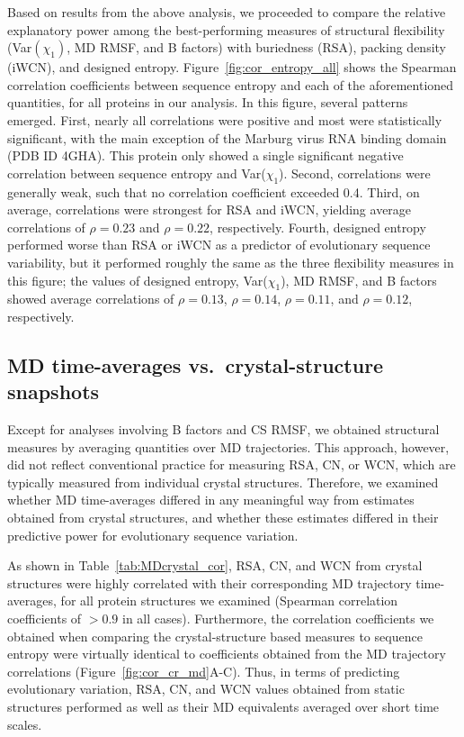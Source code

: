 \documentclass[smallextended]{svjour3}
\begin{document}
Based on results from the above analysis, we proceeded to compare the relative explanatory power among the best-performing measures of structural flexibility (Var$(\chi_1)$, MD RMSF, and B factors) with buriedness (RSA), packing density (iWCN), and designed entropy. Figure~\ref{fig:cor_entropy_all} shows the Spearman correlation coefficients between sequence entropy and each of the aforementioned quantities, for all proteins in our analysis. In this figure, several patterns emerged. First, nearly all correlations were positive and most were statistically significant, with the main exception of the Marburg virus RNA binding domain (PDB ID 4GHA). This protein only showed a single significant negative correlation between sequence entropy and Var($\chi_1$). Second, correlations were generally weak, such that no correlation coefficient exceeded 0.4. Third, on average, correlations were strongest for RSA and iWCN, yielding average correlations of $\rho=0.23$ and $\rho=0.22$, respectively. Fourth, designed entropy performed worse than RSA or iWCN as a predictor of evolutionary sequence variability, but it performed roughly the same as the three flexibility measures in this figure; the values of designed entropy, Var($\chi_1$), MD RMSF, and B factors showed average correlations of $\rho=0.13$, $\rho=0.14$, $\rho=0.11$, and $\rho=0.12$, respectively.


\subsection*{MD time-averages vs.\ crystal-structure snapshots}

Except for analyses involving B factors and CS RMSF, we obtained structural measures by averaging quantities over MD trajectories. This approach, however, did not reflect conventional practice for measuring RSA, CN, or WCN, which are typically measured from individual crystal structures. Therefore, we examined whether MD time-averages differed in any meaningful way from estimates obtained from crystal structures, and whether these estimates differed in their predictive power for evolutionary sequence variation.

As shown in Table~\ref{tab:MDcrystal_cor}, RSA, CN, and WCN from crystal structures were highly correlated with their corresponding MD trajectory time-averages, for all protein structures we examined (Spearman correlation coefficients of $>0.9$ in all cases). Furthermore, the correlation coefficients we obtained when comparing the crystal-structure based measures to sequence entropy were virtually identical to coefficients obtained from the MD trajectory correlations (Figure~\ref{fig:cor_cr_md}A-C). Thus, in terms of predicting evolutionary variation, RSA, CN, and WCN values obtained from static structures performed as well as their MD equivalents averaged over short time scales.
\end{document}
